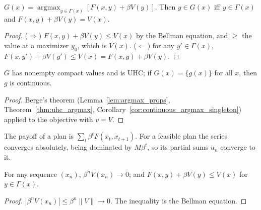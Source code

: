 \begin{definition}
\label{def:policy}
\leanok
{}
$G(x) = \operatorname{argmax}_{y \in \Gamma(x)} [F(x, y) + \beta V(y)]$. Then $y \in G(x)$ iff
$y \in \Gamma(x)$ and $F(x, y) + \beta V(y) = V(x)$.
\end{definition}
\begin{proof}
\leanok
($\Rightarrow$) $F(x, y) + \beta V(y) \le V(x)$ by the Bellman equation, and $\ge$ the value at a
maximizer $y_0$, which is $V(x)$. ($\Leftarrow$) for any $y' \in \Gamma(x)$,
$F(x, y') + \beta V(y') \le V(x) = F(x, y) + \beta V(y)$.
\end{proof}

\begin{theorem}
\label{thm:policy_uhc}
\leanok
{}
$G$ has nonempty compact values and is UHC; if $G(x) = \{g(x)\}$ for all $x$, then $g$ is continuous.
\end{theorem}
\begin{proof}
\leanok
Berge's theorem (Lemma~\ref{lem:argmax_props}, Theorem~\ref{thm:uhc_argmax},
Corollary~\ref{cor:continuous_argmax_singleton}) applied to the objective with $v = V$.
\end{proof}

\begin{definition}
\label{def:dp_payoff}
\leanok
{}
The payoff of a plan is $\sum_t \beta^t F(x_t, x_{t+1})$. For a feasible plan the series converges
absolutely, being dominated by $M \beta^t$, so its partial sums $u_n$ converge to it.
\end{definition}

\begin{lemma}
\label{lem:tendsto_discounted_value}
\leanok
{}
For any sequence $(x_n)$, $\beta^n V(x_n) \to 0$; and $F(x, y) + \beta V(y) \le V(x)$ for $y \in \Gamma(x)$.
\end{lemma}
\begin{proof}
\leanok
$|\beta^n V(x_n)| \le \beta^n \|V\| \to 0$. The inequality is the Bellman equation.
\end{proof}

